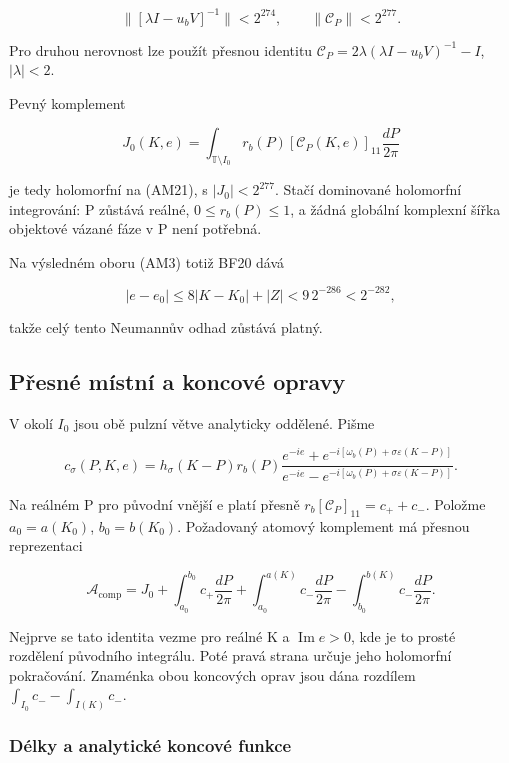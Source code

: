 \documentclass[11pt,a4paper]{article}
\theoremstyle{remark}\newtheorem{remark}[theorem]{Poznámka}
\numberwithin{equation}{section}
\begin{document}
\[
\|[\lambda I-u_bV]^{-1}\|<2^{274},\qquad
\|\mathcal C_P\|<2^{277}.
\tag{AM22}
\]

Pro druhou nerovnost lze použít přesnou identitu
\(\mathcal C_P=2\lambda(\lambda I-u_bV)^{-1}-I\), \(|\lambda|<2\).

Pevný komplement

\[
J_0(K,e)=\int_{\mathbb T\setminus I_0}
r_b(P)[\mathcal C_P(K,e)]_{11}\frac{dP}{2\pi}
\tag{AM23}
\]

je tedy holomorfní na (AM21), s \(|J_0|<2^{277}\). Stačí dominované
holomorfní integrování: P zůstává reálné, \(0\le r_b(P)\le1\), a žádná
globální komplexní šířka objektové vázané fáze v P není potřebná.

Na výsledném oboru (AM3) totiž BF20 dává

\[
|e-e_0|\le8|K-K_0|+|Z|<9\,2^{-286}<2^{-282},
\tag{AM24}
\]

takže celý tento Neumannův odhad zůstává platný.

\hypertarget{pux159esnuxe9-muxedstnuxed-a-koncovuxe9-opravy}{%
\subsection{Přesné místní a koncové
opravy}\label{pux159esnuxe9-muxedstnuxed-a-koncovuxe9-opravy}}

V okolí \(I_0\) jsou obě pulzní větve analyticky oddělené. Pišme

\[
c_\sigma(P,K,e)=h_\sigma(K-P)r_b(P)
\frac{e^{-ie}+e^{-i[\omega_b(P)+\sigma\varepsilon(K-P)]}}
{e^{-ie}-e^{-i[\omega_b(P)+\sigma\varepsilon(K-P)]}}.
\tag{AM25}
\]

Na reálném P pro původní vnější e platí přesně
\(r_b[\mathcal C_P]_{11}=c_++c_-\). Položme \(a_0=a(K_0)\),
\(b_0=b(K_0)\). Požadovaný atomový komplement má přesnou reprezentaci

\[
\boxed{
\mathcal A_{\mathrm{comp}}
=J_0
 +\int_{a_0}^{b_0}c_+\frac{dP}{2\pi}
 +\int_{a_0}^{a(K)}c_-\frac{dP}{2\pi}
 -\int_{b_0}^{b(K)}c_-\frac{dP}{2\pi}.}
\tag{AM26}
\]

Nejprve se tato identita vezme pro reálné K a \(\operatorname{Im}e>0\),
kde je to prosté rozdělení původního integrálu. Poté pravá strana určuje
jeho holomorfní pokračování. Znaménka obou koncových oprav jsou dána
rozdílem \(\int_{I_0}c_- -\int_{I(K)}c_-\).

\hypertarget{duxe9lky-a-analytickuxe9-koncovuxe9-funkce}{%
\subsubsection{Délky a analytické koncové
funkce}\label{duxe9lky-a-analytickuxe9-koncovuxe9-funkce}}
\end{document}
